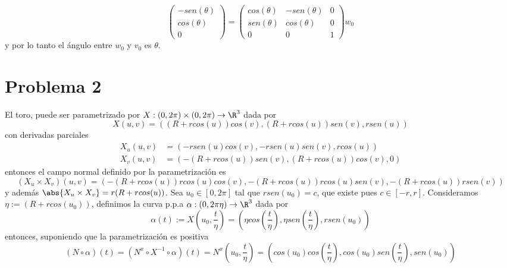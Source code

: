 \documentclass{article}
\begin{document}
\begin{enumerate}
\begin{equation*}
\begin{pmatrix}
            -sen(\theta) \\ cos(\theta) \\ 0
        \end{pmatrix}=\begin{pmatrix}
            cos(\theta) & -sen(\theta) & 0 \\ sen(\theta) & cos(\theta) & 0 \\ 0 & 0 & 1
        \end{pmatrix}w_{0}
    \end{equation*}
    y por lo tanto el ángulo entre $w_{0}$ y $v_{0}$ es $\theta$.
\end{enumerate}

\section*{Problema 2}
\noindent El toro, puede ser parametrizado por $X:(0,2\pi)\times(0,2\pi)\to\R^{3}$ dada por
\begin{equation*}
    X(u,v)=((R+rcos(u))cos(v),(R+rcos(u))sen(v),rsen(u))
\end{equation*}
con derivadas parciales
\begin{align*}
    X_{u}(u,v) &= (-rsen(u)cos(v),-rsen(u)sen(v),rcos(u)) \\
    X_{v}(u,v) &= (-(R+rcos(u))sen(v),(R+rcos(u))cos(v),0)
\end{align*}
entonces el campo normal definido por la parametrización es
\begin{equation*}
    (X_{u}\times X_{v})(u,v)=(-(R+rcos(u))rcos(u)cos(v),-(R+rcos(u))rcos(u)sen(v),
    -(R+rcos(u))rsen(v))
\end{equation*}
y además $\abs{X_{u}\times X_{v}}=r(R+rcos(u))$. Sea $u_{0}\in[0,2\pi]$ tal que $rsen(u_{0})=c$, 
que existe pues $c\in[-r,r]$. Consideramos $\eta:=(R+rcos(u_{0}))$, definimos la curva p.p.a 
$\alpha:(0,2\pi\eta)\to\R^{3}$ dada por
\begin{equation*}
    \alpha(t):=X\left(u_{0},\frac{t}{\eta}\right)=\left(\eta cos\left(\frac{t}{\eta}\right),
    \eta sen\left(\frac{t}{\eta}\right),rsen(u_{0})\right)
\end{equation*}
entonces, suponiendo que la parametrización es positiva
\begin{equation*}
    (N\circ\alpha)(t)=(N^{x}\circ X^{-1}\circ\alpha)(t)=N^{x}\left(u_{0},\frac{t}{\eta}\right)
    =\left(cos(u_{0})cos\left(\frac{t}{\eta}\right),cos(u_{0})sen\left(\frac{t}{\eta}\right),
    sen(u_{0})\right)
\end{equation*}
\end{document}
